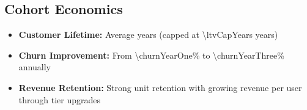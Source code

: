 \subsection{Cohort Economics}
\begin{itemize}
    \item \textbf{Customer Lifetime:} Average  years (capped at \num{\ltvCapYears} years)
    \item \textbf{Churn Improvement:} From \num{\churnYearOne}\% to \num{\churnYearThree}\% annually
    \item \textbf{Revenue Retention:} Strong unit retention with growing revenue per user through tier upgrades
\end{itemize}
